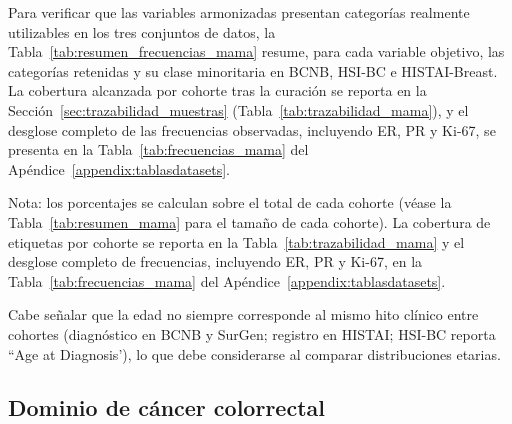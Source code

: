 Para verificar que las variables armonizadas presentan categorías realmente utilizables en los tres conjuntos de datos, la Tabla~\ref{tab:resumen_frecuencias_mama} resume, para cada variable objetivo, las categorías retenidas y su clase minoritaria en BCNB, HSI-BC e HISTAI-Breast. La cobertura alcanzada por cohorte tras la curación se reporta en la Sección~\ref{sec:trazabilidad_muestras} (Tabla~\ref{tab:trazabilidad_mama}), y el desglose completo de las frecuencias observadas, incluyendo ER, PR y Ki-67, se presenta en la Tabla~\ref{tab:frecuencias_mama} del Apéndice~\ref{appendix:tablasdatasets}.

\begin{table}[htbp]
\centering
\caption{Variables objetivo del dominio de mama: categorías retenidas y clases minoritarias tras la curación.}
\label{tab:resumen_frecuencias_mama}
\small
{}

\vspace{4pt}
Nota: los porcentajes se calculan sobre el total de cada cohorte (véase la Tabla~\ref{tab:resumen_mama} para el tamaño de cada cohorte). La cobertura de etiquetas por cohorte se reporta en la Tabla~\ref{tab:trazabilidad_mama} y el desglose completo de frecuencias, incluyendo ER, PR y Ki-67, en la Tabla~\ref{tab:frecuencias_mama} del Apéndice~\ref{appendix:tablasdatasets}.
\end{table}

Cabe señalar que la edad no siempre corresponde al mismo hito clínico entre cohortes (diagnóstico en BCNB y SurGen; registro en HISTAI; HSI-BC reporta ``Age at Diagnosis'), lo que debe considerarse al comparar distribuciones etarias.

\subsection{Dominio de cáncer colorrectal}

